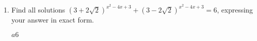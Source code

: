 \begin{enumerate} [leftmargin=0cm]
\item Find all solutions $ (3+2\sqrt{2})^{x^2-4x+3} + (3-2\sqrt{2})^{x^2-4x+3} = 6$, expressing your answer in exact form.\\
            \begin{envAnswer}[blankline=10] $             a6                                                          $ \end{envAnswer}

\end{enumerate}



